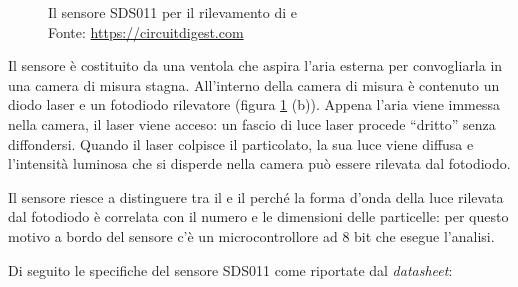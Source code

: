 \begin{figure}[H]%
    \centering
    \captionsetup{justification=centering}
    \caption{Il sensore SDS011 per il rilevamento di  e \\Fonte: \url{https://circuitdigest.com}}%
    \label{fig:mics}%
\end{figure}

Il sensore è costituito da una ventola che aspira l’aria esterna per convogliarla in una camera di misura stagna. All’interno della camera di misura è contenuto un diodo laser e un fotodiodo rilevatore (figura \ref{fig:mics} (b)). Appena l’aria viene immessa nella camera, il laser viene acceso: un fascio di luce laser procede “dritto” senza diffondersi. Quando il laser colpisce il particolato, la sua luce viene diffusa e l’intensità luminosa che si disperde nella camera può essere rilevata dal fotodiodo. 

Il sensore riesce a distinguere tra il  e il  perché la forma d’onda della luce rilevata dal fotodiodo è correlata con il numero e le dimensioni delle particelle: per questo motivo a bordo del sensore c’è un microcontrollore ad 8 bit che esegue l’analisi. \cite{sds}

Di seguito le specifiche del sensore SDS011 come riportate dal \textit{datasheet}:

